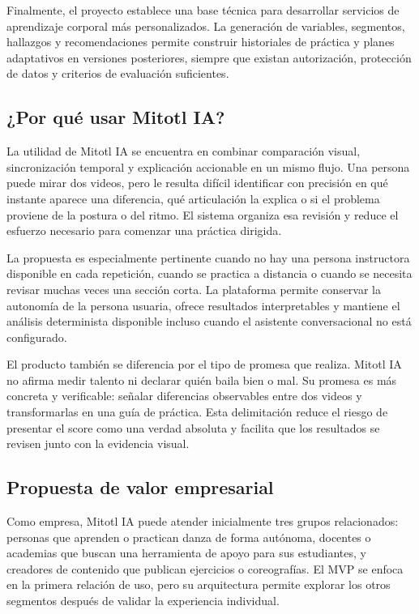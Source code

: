 \documentclass[12pt,a4paper]{article}
\begin{document}
Finalmente, el proyecto establece una base técnica para desarrollar servicios de aprendizaje corporal más personalizados. La generación de variables, segmentos, hallazgos y recomendaciones permite construir historiales de práctica y planes adaptativos en versiones posteriores, siempre que existan autorización, protección de datos y criterios de evaluación suficientes.

\subsection{¿Por qué usar Mitotl IA?}
La utilidad de Mitotl IA se encuentra en combinar comparación visual, sincronización temporal y explicación accionable en un mismo flujo. Una persona puede mirar dos videos, pero le resulta difícil identificar con precisión en qué instante aparece una diferencia, qué articulación la explica o si el problema proviene de la postura o del ritmo. El sistema organiza esa revisión y reduce el esfuerzo necesario para comenzar una práctica dirigida.

La propuesta es especialmente pertinente cuando no hay una persona instructora disponible en cada repetición, cuando se practica a distancia o cuando se necesita revisar muchas veces una sección corta. La plataforma permite conservar la autonomía de la persona usuaria, ofrece resultados interpretables y mantiene el análisis determinista disponible incluso cuando el asistente conversacional no está configurado.

El producto también se diferencia por el tipo de promesa que realiza. Mitotl IA no afirma medir talento ni declarar quién baila bien o mal. Su promesa es más concreta y verificable: señalar diferencias observables entre dos videos y transformarlas en una guía de práctica. Esta delimitación reduce el riesgo de presentar el score como una verdad absoluta y facilita que los resultados se revisen junto con la evidencia visual.

\subsection{Propuesta de valor empresarial}
Como empresa, Mitotl IA puede atender inicialmente tres grupos relacionados: personas que aprenden o practican danza de forma autónoma, docentes o academias que buscan una herramienta de apoyo para sus estudiantes, y creadores de contenido que publican ejercicios o coreografías. El MVP se enfoca en la primera relación de uso, pero su arquitectura permite explorar los otros segmentos después de validar la experiencia individual.
\end{document}
